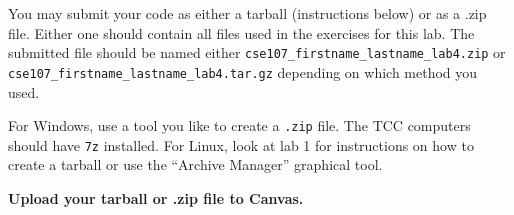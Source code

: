 \documentclass[11pt]{cselabheader}
\begin{document}
You may submit your code as either a tarball (instructions below) or as a .zip
file. Either one should contain all files used in the exercises for this lab.
The submitted file should be named either
\texttt{cse107\_firstname\_lastname\_lab4.zip} or
\texttt{cse107\_firstname\_lastname\_lab4.tar.gz} depending on which method you
used.

For Windows, use a tool you like to create a \texttt{.zip} file. The TCC
computers should have \texttt{7z} installed. For Linux, look at lab 1 for
instructions on how to create a tarball or use the ``Archive Manager'' graphical
tool.

\begin{center}
  \textbf{Upload your tarball or .zip file to Canvas.}
\end{center}
\end{document}
